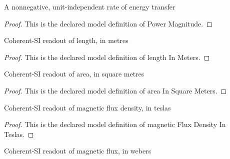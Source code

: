 \begin{definition}
  \label{def:physics:phyx-mini-0932:phyxminiproblems-problemphyxmini0932-powermagnitude}
  A nonnegative, unit-independent rate of energy transfer
\end{definition}
\begin{proof}
  This is the declared model definition of Power Magnitude.
\end{proof}
\begin{definition}
  \label{def:physics:phyx-mini-0932:phyxminiproblems-problemphyxmini0932-lengthinmeters}
  Coherent-SI readout of length, in metres
\end{definition}
\begin{proof}
  This is the declared model definition of length In Meters.
\end{proof}
\begin{definition}
  \label{def:physics:phyx-mini-0932:phyxminiproblems-problemphyxmini0932-areainsquaremeters}
  Coherent-SI readout of area, in square metres
\end{definition}
\begin{proof}
  This is the declared model definition of area In Square Meters.
\end{proof}
\begin{definition}
  \label{def:physics:phyx-mini-0932:phyxminiproblems-problemphyxmini0932-magneticfluxdensityinteslas}
  Coherent-SI readout of magnetic flux density, in teslas
\end{definition}
\begin{proof}
  This is the declared model definition of magnetic Flux Density In Teslas.
\end{proof}
\begin{definition}
  \label{def:physics:phyx-mini-0932:phyxminiproblems-problemphyxmini0932-magneticfluxinwebers}
  Coherent-SI readout of magnetic flux, in webers
\end{definition}
